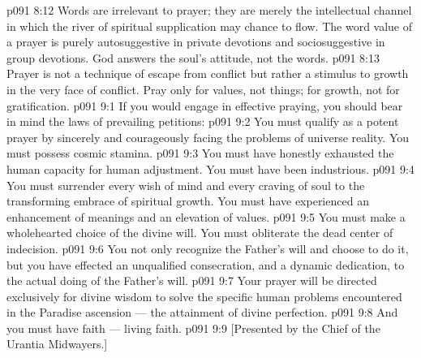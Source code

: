 \vs p091 8:12 Words are irrelevant to prayer; they are merely the intellectual channel in which the river of spiritual supplication may chance to flow. The word value of a prayer is purely autosuggestive in private devotions and sociosuggestive in group devotions. God answers the soul’s attitude, not the words.
\vs p091 8:13 Prayer is not a technique of escape from conflict but rather a stimulus to growth in the very face of conflict. Pray only for values, not things; for growth, not for gratification.
\vs p091 9:1 If you would engage in effective praying, you should bear in mind the laws of prevailing petitions:
\vs p091 9:2 \bibnobreakspace You must qualify as a potent prayer by sincerely and courageously facing the problems of universe reality. You must possess cosmic stamina.
\vs p091 9:3 \pc {}\bibnobreakspace You must have honestly exhausted the human capacity for human adjustment. You must have been industrious.
\vs p091 9:4 \pc {}\bibnobreakspace You must surrender every wish of mind and every craving of soul to the transforming embrace of spiritual growth. You must have experienced an enhancement of meanings and an elevation of values.
\vs p091 9:5 \pc {}\bibnobreakspace You must make a wholehearted choice of the divine will. You must obliterate the dead center of indecision.
\vs p091 9:6 \pc {}\bibnobreakspace You not only recognize the Father’s will and choose to do it, but you have effected an unqualified consecration, and a dynamic dedication, to the actual doing of the Father’s will.
\vs p091 9:7 \pc {}\bibnobreakspace Your prayer will be directed exclusively for divine wisdom to solve the specific human problems encountered in the Paradise ascension --- the attainment of divine perfection.
\vs p091 9:8 \pc {}\bibnobreakspace And you must have faith --- living faith.
\vsetoff
\vs p091 9:9 [Presented by the Chief of the Urantia Midwayers.]
